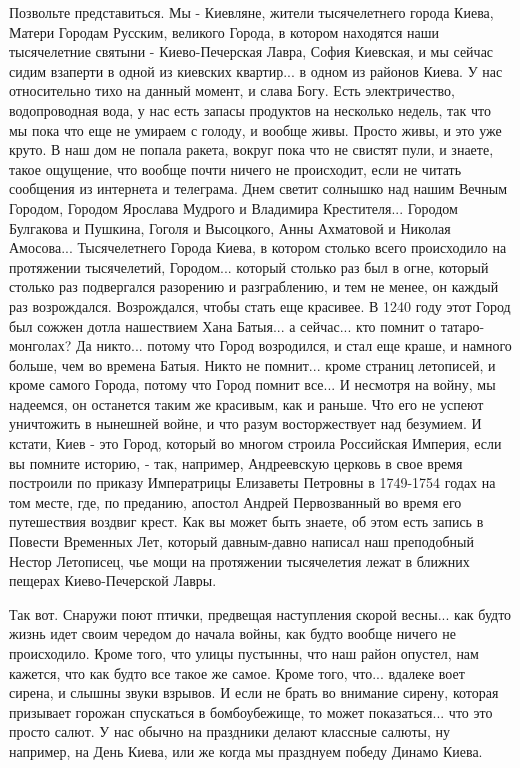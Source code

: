 Позвольте представиться. Мы - Киевляне, жители тысячелетнего города Киева,
Матери Городам Русским, великого Города, в котором находятся наши тысячелетние
святыни - Киево-Печерская Лавра, София Киевская, и мы сейчас сидим взаперти в
одной из киевских квартир... в одном из районов Киева. У нас относительно тихо
на данный момент, и слава Богу. Есть электричество, водопроводная вода, у нас
есть запасы продуктов на несколько недель, так что мы пока что еще не умираем с
голоду, и вообще живы. Просто живы, и это уже круто. В наш дом не попала
ракета, вокруг пока что не свистят пули, и знаете, такое ощущение, что вообще
почти ничего не происходит, если не читать сообщения из интернета и телеграма.
Днем светит солнышко над нашим Вечным Городом, Городом Ярослава Мудрого и
Владимира Крестителя... Городом Булгакова и Пушкина, Гоголя и Высоцкого, Анны
Ахматовой и Николая Амосова...  Тысячелетнего Города Киева, в котором столько
всего происходило на протяжении тысячелетий, Городом... который столько раз был
в огне, который столько раз подвергался разорению и разграблению, и тем не
менее, он каждый раз возрождался. Возрождался, чтобы стать еще красивее. В 1240
году этот Город был сожжен дотла нашествием Хана Батыя... а сейчас... кто
помнит о татаро-монголах?  Да никто... потому что Город возродился, и стал еще
краше, и намного больше, чем во времена Батыя. Никто не помнит... кроме страниц
летописей, и кроме самого Города, потому что Город помнит все... И несмотря на
войну, мы надеемся, он останется таким же красивым, как и раньше.  Что его не
успеют уничтожить в нынешней войне, и что разум восторжествует над безумием.  И
кстати, Киев - это Город, который во многом строила Российская Империя, если вы
помните историю, - так, например, Андреевскую церковь в свое время построили по
приказу Императрицы Елизаветы Петровны в 1749-1754 годах на том месте, где, по
преданию, апостол Андрей Первозванный во время его путешествия воздвиг крест.
Как вы может быть знаете, об этом есть запись в Повести Временных Лет, который
давным-давно написал наш преподобный Нестор Летописец, чье мощи на протяжении
тысячелетия лежат в ближних пещерах Киево-Печерской Лавры.

Так вот. Снаружи поют птички, предвещая наступления скорой весны... как будто
жизнь идет своим чередом до начала войны, как будто вообще ничего не
происходило. Кроме того, что улицы пустынны, что наш район опустел, нам
кажется, что как будто все такое же самое. Кроме того, что... вдалеке воет
сирена, и слышны звуки взрывов.  И если не брать во внимание сирену, которая
призывает горожан спускаться в бомбоубежище, то может показаться... что это
просто салют. У нас обычно на праздники делают классные салюты, ну например, на
День Киева, или же когда мы празднуем победу Динамо Киева.

